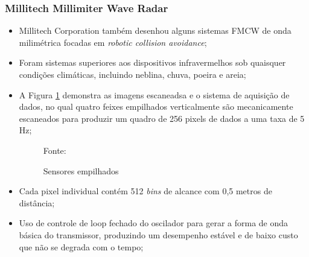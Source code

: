 \documentclass[xcolor=dvipsnames, aspectratio=169]{beamer}
\begin{document}
\begin{frame}
\frametitle{Millitech Millimiter Wave Radar}
	\begin{itemize}
		\item Millitech Corporation também desenhou alguns sistemas FMCW de onda milimétrica focadas em \textit{robotic collision avoidance};
		\item Foram sistemas superiores aos dispositivos infravermelhos sob quaisquer condições climáticas, incluindo neblina, chuva, poeira e areia;
        \item A Figura \ref{fig:militech} demonstra as imagens escaneadsa e o sistema de aquisição de dados, no qual quatro feixes empilhados verticalmente são mecanicamente escaneados para produzir um quadro de 256 pixels de dados a uma taxa de 5 Hz;
        \begin{figure}
            \centering
            {Fonte: \cite{everett1995sensors}}
            \caption{Sensores empilhados }
            \label{fig:militech}
        \end{figure}
        
        \item Cada pixel individual contém 512 \textit{bins} de alcance com 0,5 metros de distância;
        \item Uso de controle de loop fechado do oscilador para gerar a forma de onda básica do transmissor, produzindo um desempenho estável e de baixo custo que não se degrada com o tempo;
        

\end{itemize}
\end{frame}
\end{document}
